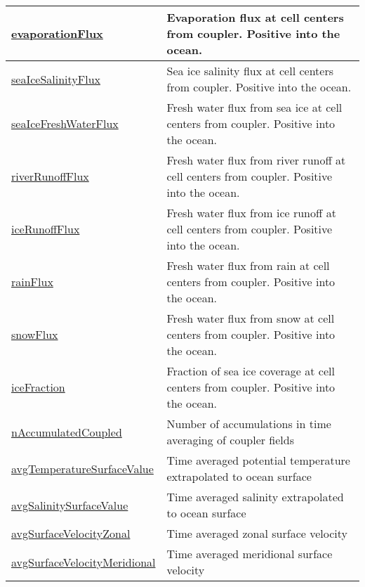 {\begin{center}
\begin{longtable}{| p{2.0in} | p{4.0in} |}
    \hyperref[subsec:var_sec_forcing_evaporationFlux]{evaporationFlux} & Evaporation flux at cell centers from coupler. Positive into the ocean. \\
    \hline
    \hyperref[subsec:var_sec_forcing_seaIceSalinityFlux]{seaIceSalinityFlux} & Sea ice salinity flux at cell centers from coupler. Positive into the ocean. \\
    \hline
    \hyperref[subsec:var_sec_forcing_seaIceFreshWaterFlux]{seaIceFreshWaterFlux} & Fresh water flux from sea ice at cell centers from coupler. Positive into the ocean. \\
    \hline
    \hyperref[subsec:var_sec_forcing_riverRunoffFlux]{riverRunoffFlux} & Fresh water flux from river runoff at cell centers from coupler. Positive into the ocean. \\
    \hline
    \hyperref[subsec:var_sec_forcing_iceRunoffFlux]{iceRunoffFlux} & Fresh water flux from ice runoff at cell centers from coupler. Positive into the ocean. \\
    \hline
    \hyperref[subsec:var_sec_forcing_rainFlux]{rainFlux} & Fresh water flux from rain at cell centers from coupler. Positive into the ocean. \\
    \hline
    \hyperref[subsec:var_sec_forcing_snowFlux]{snowFlux} & Fresh water flux from snow at cell centers from coupler. Positive into the ocean. \\
    \hline
    \hyperref[subsec:var_sec_forcing_iceFraction]{iceFraction} & Fraction of sea ice coverage at cell centers from coupler. Positive into the ocean. \\
    \hline
    \hyperref[subsec:var_sec_forcing_nAccumulatedCoupled]{nAccumulatedCoupled} & Number of accumulations in time averaging of coupler fields \\
    \hline
    \hyperref[subsec:var_sec_forcing_avgTemperatureSurfaceValue]{avgTemperatureSurfaceValue} & Time averaged potential temperature extrapolated to ocean surface \\
    \hline
    \hyperref[subsec:var_sec_forcing_avgSalinitySurfaceValue]{avgSalinitySurfaceValue} & Time averaged salinity extrapolated to ocean surface \\
    \hline
    \hyperref[subsec:var_sec_forcing_avgSurfaceVelocityZonal]{avgSurfaceVelocityZonal} & Time averaged zonal surface velocity \\
    \hline
    \hyperref[subsec:var_sec_forcing_avgSurfaceVelocityMeridional]{avgSurfaceVelocityMeridional} & Time averaged meridional surface velocity \\

\end{longtable}
\end{center}}
